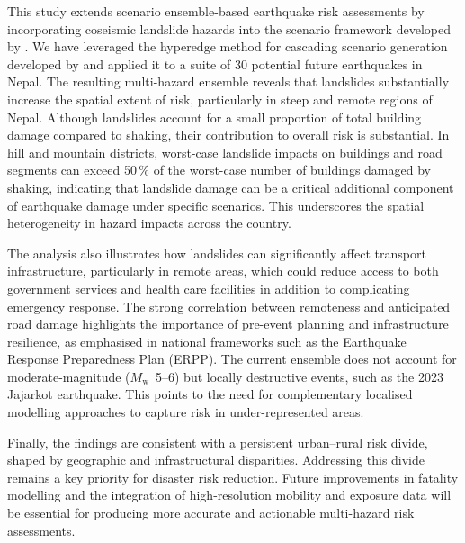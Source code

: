 \documentclass[nhess, manuscript]{copernicus}
\begin{document}
\conclusions

This study extends scenario ensemble-based earthquake risk assessments by incorporating coseismic landslide hazards into the scenario framework developed by \citet{Robinson2018}. We have leveraged the hyperedge method for cascading scenario generation developed by \citet{Dunant2025} and applied it to a suite of 30 potential future earthquakes in Nepal. The resulting multi-hazard ensemble reveals that landslides substantially increase the spatial extent of risk, particularly in steep and remote regions of Nepal. Although landslides account for a small proportion of total building damage compared to shaking, their contribution to overall risk is substantial. In hill and mountain districts, worst-case landslide impacts on buildings and road segments can exceed 50\,\% of the worst-case number of buildings damaged by shaking, indicating that landslide damage can be a critical additional component of earthquake damage under specific scenarios. This underscores the spatial heterogeneity in hazard impacts across the country.

The analysis also illustrates how landslides can significantly affect transport infrastructure, particularly in remote areas, which could reduce access to both government services and health care facilities in addition to complicating emergency response. The strong correlation between remoteness and anticipated road damage highlights the importance of pre-event planning and infrastructure resilience, as emphasised in national frameworks such as the Earthquake Response Preparedness Plan (ERPP). The current ensemble does not account for moderate-magnitude ($M_{\mathrm{w}}$~5--6) but locally destructive events, such as the 2023 Jajarkot earthquake. This points to the need for complementary localised modelling approaches to capture risk in under-represented areas.

Finally, the findings are consistent with a persistent urban--rural risk divide, shaped by geographic and infrastructural disparities. Addressing this divide remains a key priority for disaster risk reduction. Future improvements in fatality modelling and the integration of high-resolution mobility and exposure data will be essential for producing more accurate and actionable multi-hazard risk assessments.
\end{document}
